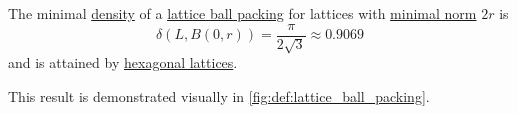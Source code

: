 \begin{proposition}\label{thm:minimal_disk_packing_density}
  The minimal \hyperref[def:lattice_packing_density]{density} of a \hyperref[def:lattice_ball_packing]{lattice ball packing} for lattices with \hyperref[def:minimal_lattice_vector]{minimal norm} \( 2r \) is
  \begin{equation}\label{eq:thm:minimal_disk_packing_density}
    \delta(L, B(0, r)) = \frac \pi {2 \sqrt 3} \approx 0.9069
  \end{equation}
  and is attained by \hyperref[def:hexagonal_point_lattice]{hexagonal lattices}.
\end{proposition}
\begin{comments}
  \item This result is demonstrated visually in \cref{fig:def:lattice_ball_packing}.
\end{comments}
